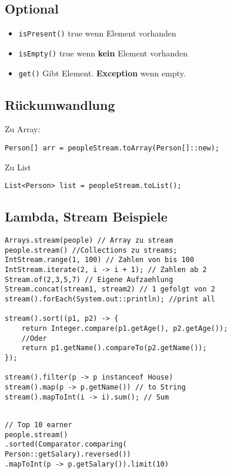 \begin{multicols*}{5}
	\subsection{Optional}
		\begin{itemize}
			\item \tiny \textcolor{b}{\texttt{isPresent()}}
				\footnotesize true wenn Element vorhanden
			\item \tiny \textcolor{b}{\texttt{isEmpty()}}
				\footnotesize true wenn \textbf{kein} Element vorhanden
			\item \tiny \textcolor{b}{\texttt{get()}}
				\footnotesize Gibt Element. \textbf{Exception} wenn empty.
		\end{itemize}
	\subsection{Rückumwandlung}
		\textcolor{b}{Zu Array:}
		\begin{lstlisting}
Person[] arr = peopleStream.toArray(Person[]::new);
		\end{lstlisting}
		\textcolor{b}{Zu List}
		\begin{lstlisting}
List<Person> list = peopleStream.toList();
		\end{lstlisting}	
	
		\subsection{Lambda, Stream Beispiele}
	\begin{lstlisting}
Arrays.stream(people) // Array zu stream
people.stream() //Collections zu streams;
IntStream.range(1, 100) // Zahlen von bis 100
IntStream.iterate(2, i -> i + 1); // Zahlen ab 2
Stream.of(2,3,5,7) // Eigene Aufzaehlung
Stream.concat(stream1, stream2) // 1 gefolgt von 2
stream().forEach(System.out::println); //print all

stream().sort((p1, p2) -> { 
	return Integer.compare(p1.getAge(), p2.getAge());
	//Oder
	return p1.getName().compareTo(p2.getName());
});

stream().filter(p -> p instanceof House)
stream().map(p -> p.getName()) // to String
stream().mapToInt(i -> i).sum(); // Sum
	\end{lstlisting}
	\begin{lstlisting}
		
// Top 10 earner
people.stream()
.sorted(Comparator.comparing(
Person::getSalary).reversed())
.mapToInt(p -> p.getSalary()).limit(10)


\end{lstlisting}
\end{multicols*}

